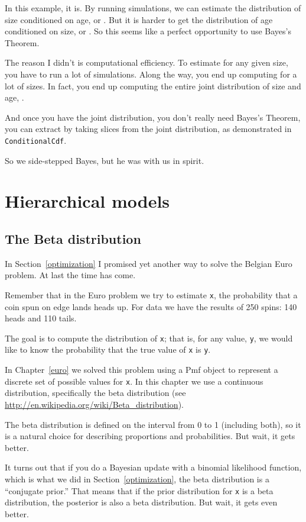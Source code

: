 \documentclass[12pt]{book}
\begin{document}
In this example, it is.  By running simulations, we can estimate the
distribution of size conditioned on age, or .  But it is
harder to get the distribution of age conditioned on size, or
.  So this seems like a perfect opportunity to use Bayes's
Theorem.

The reason I didn't is computational efficiency.  To estimate
 for any given size, you have to run a lot of simulations.
Along the way, you end up computing  for a lot of sizes.
In fact, you end up computing the entire joint distribution of size
and age, .

And once you have the joint distribution, you don't really need
Bayes's Theorem, you can extract  by taking slices from
the joint distribution, as demonstrated in {\tt ConditionalCdf}.

So we side-stepped Bayes, but he was with us in spirit.

\chapter{Hierarchical models}

\section{The Beta distribution}
\label{beta}

In Section~\ref{optimization} I promised yet another way to solve the
Belgian Euro problem.  At last the time has come.

Remember that in the Euro problem we try to estimate {\tt x}, the
probability that a coin spun on edge lands heads up.
For data we have the results of 250 spins: 140 heads and 110 tails.

The goal is to compute the distribution of {\tt x}; that is, for any
value, {\tt y}, we would like to know the
probability that the true value of {\tt x} is {\tt y}.

In Chapter~\ref{euro} we solved this problem using a Pmf object to
represent a discrete set of possible values for {\tt x}.  In this
chapter we use a continuous distribution, specifically the beta
distribution (see
\url{http://en.wikipedia.org/wiki/Beta_distribution}).

The beta distribution is defined on the interval from 0 to 1
(including both), so it is a natural choice for describing
proportions and probabilities.  But wait, it gets better.

It turns out that if you do a Bayesian update with a binomial
likelihood function, which is what we did in
Section~\ref{optimization}, the beta distribution is a ``conjugate
prior.''  That means that if the prior distribution for {\tt x} is a
beta distribution, the posterior is also a beta distribution.  But
wait, it gets even better.
\end{document}
